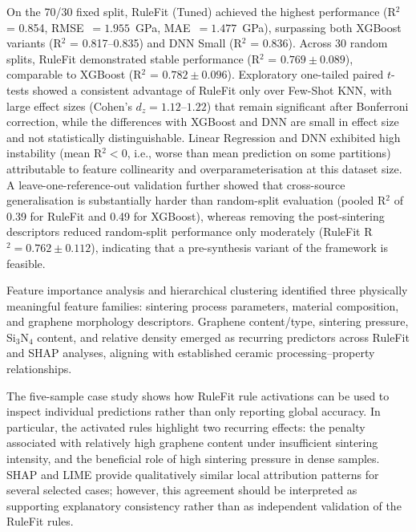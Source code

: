 \documentclass[pdflatex,sn-mathphys-num]{sn-jnl}%
\theoremstyle{thmstyleone}%
\theoremstyle{thmstyletwo}%
\theoremstyle{thmstylethree}%
\begin{document}
On the 70/30 fixed split, RuleFit (Tuned) achieved the highest performance (R$^2$ = 0.854, RMSE~$= 1.955$~GPa, MAE~$= 1.477$~GPa), surpassing both XGBoost variants (R$^2$ = 0.817--0.835) and DNN Small (R$^2$ = 0.836). Across 30 random splits, RuleFit demonstrated stable performance (R$^2$ = $0.769 \pm 0.089$), comparable to XGBoost (R$^2$ = $0.782 \pm 0.096$). Exploratory one-tailed paired $t$-tests showed a consistent advantage of RuleFit only over Few-Shot KNN, with large effect sizes (Cohen's $d_z = 1.12$--$1.22$) that remain significant after Bonferroni correction, while the differences with XGBoost and DNN are small in effect size and not statistically distinguishable. Linear Regression and DNN exhibited high instability (mean R$^2 < 0$, i.e., worse than mean prediction on some partitions) attributable to feature collinearity and overparameterisation at this dataset size. A leave-one-reference-out validation further showed that cross-source generalisation is substantially harder than random-split evaluation (pooled R$^2$ of 0.39 for RuleFit and 0.49 for XGBoost), whereas removing the post-sintering descriptors reduced random-split performance only moderately (RuleFit R$^2 = 0.762 \pm 0.112$), indicating that a pre-synthesis variant of the framework is feasible.

Feature importance analysis and hierarchical clustering identified three physically meaningful feature families: sintering process parameters, material composition, and graphene morphology descriptors. Graphene content/type, sintering pressure, Si$_3$N$_4$ content, and relative density emerged as recurring predictors across RuleFit and SHAP analyses, aligning with established ceramic processing--property relationships.

The five-sample case study shows how RuleFit rule activations can be used to inspect individual predictions rather than only reporting global accuracy. In particular, the activated rules highlight two recurring effects: the penalty associated with relatively high graphene content under insufficient sintering intensity, and the beneficial role of high sintering pressure in dense samples. SHAP and LIME provide qualitatively similar local attribution patterns for several selected cases; however, this agreement should be interpreted as supporting explanatory consistency rather than as independent validation of the RuleFit rules.
\end{document}
